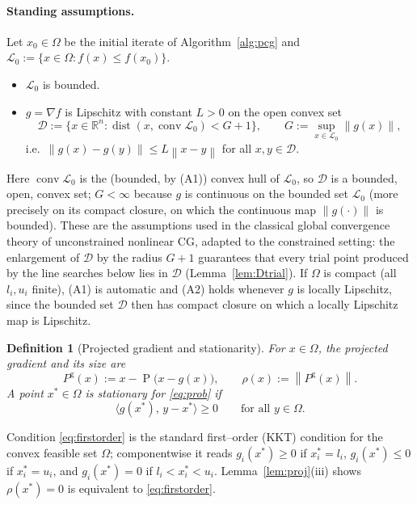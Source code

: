 \documentclass[12pt]{article}
\newtheorem{definition}{Definition}
\DeclareMathOperator{\proj}{P}
\newcommand{\R}{\mathbb{R}}
\newcommand{\norm}[1]{\left\lVert #1 \right\rVert}
\newcommand{\inner}[2]{\langle #1,\, #2\rangle}
\begin{document}
\paragraph{Standing assumptions.} Let $x_0\in\Omega$ be the initial iterate of
Algorithm~\ref{alg:pcg} and $\mathcal L_0:=\{x\in\Omega: f(x)\le f(x_0)\}$.
\begin{itemize}
\item[(A1)] $\mathcal L_0$ is bounded.
\item[(A2)] $g=\nabla f$ is Lipschitz with constant $L>0$ on the open convex set
\begin{equation}\label{eq:Ddef}
\mathcal D:=\big\{x\in\R^n:\operatorname{dist}(x,\operatorname{conv}\mathcal L_0)<G+1\big\},
\qquad G:=\sup_{x\in\mathcal L_0}\norm{g(x)},
\end{equation}
i.e.\ $\norm{g(x)-g(y)}\le L\norm{x-y}$ for all $x,y\in\mathcal D$.
\end{itemize}
Here $\operatorname{conv}\mathcal L_0$ is the (bounded, by (A1)) convex hull of
$\mathcal L_0$, so $\mathcal D$ is a bounded, open, convex set; $G<\infty$
because $g$ is continuous on the bounded set $\mathcal L_0$ (more precisely on
its compact closure, on which the continuous map $\norm{g(\cdot)}$ is bounded).
These are the assumptions used in the classical global convergence theory of
unconstrained nonlinear CG, adapted to the constrained setting: the enlargement
of $\mathcal D$ by the radius $G+1$ guarantees that every trial point produced
by the line searches below lies in $\mathcal D$ (Lemma~\ref{lem:Dtrial}).
If $\Omega$ is compact (all $l_i,u_i$ finite), (A1) is automatic and (A2) holds
whenever $g$ is locally Lipschitz, since the bounded set $\mathcal D$ then has
compact closure on which a locally Lipschitz map is Lipschitz.

\begin{definition}[Projected gradient and stationarity]\label{def:stat}
For $x\in\Omega$, the \emph{projected gradient} and its size are
\begin{equation}\label{eq:pgrad}
P^{\mathrm g}(x):=x-\proj\!\big(x-g(x)\big),\qquad \rho(x):=\norm{P^{\mathrm g}(x)}.
\end{equation}
A point $x^*\in\Omega$ is \emph{stationary} for \eqref{eq:prob} if
\begin{equation}\label{eq:firstorder}
\inner{g(x^*)}{y-x^*}\ge0\qquad\text{for all }y\in\Omega.
\end{equation}
\end{definition}

Condition \eqref{eq:firstorder} is the standard first--order (KKT) condition for
the convex feasible set $\Omega$; componentwise it reads $g_i(x^*)\ge0$ if
$x^*_i=l_i$, $g_i(x^*)\le0$ if $x^*_i=u_i$, and $g_i(x^*)=0$ if
$l_i<x^*_i<u_i$. Lemma~\ref{lem:proj}(iii) shows $\rho(x^*)=0$ is equivalent to
\eqref{eq:firstorder}.
\end{document}
